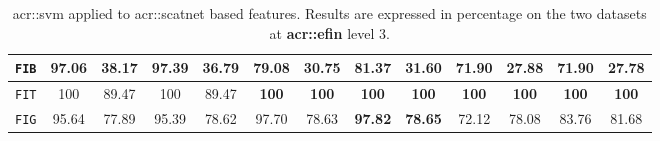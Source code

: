 \begin{sidewaystable}[htpb]
\begin{tabular}{| c | c c | c c | c c | c c | c c | c c |}
                    \hline
                    \texttt{FIB} & \textbf{97.06} & \textbf{38.17} & 97.39 & 36.79 & 79.08 & 30.75 & 81.37 & 31.60 & 71.90 & 27.88 & 71.90 & 27.78 \\
                    \hline
                    \texttt{FIT} & 100 & 89.47 & 100 & 89.47 & \textbf{100} & \textbf{100} & \textbf{100} & \textbf{100} & \textbf{100} & \textbf{100} & \textbf{100} & \textbf{100} \\
                    \hline
                    \texttt{FIG} & 95.64 & 77.89 & 95.39 & 78.62 & 97.70 & 78.63 & \textbf{97.82} & \textbf{78.65} & 72.12 & 78.08 & 83.76 & 81.68 \\
                    \hline
                \end{tabular}
                \caption{
                    \label{tab::stats_scat_svm_f3}
                    \gls{acr::svm} applied to \gls{acr::scatnet} based features.
                    Results are expressed in percentage on the two datasets at \textbf{\gls{acr::efin}} level 3.
                }
            \end{sidewaystable}

